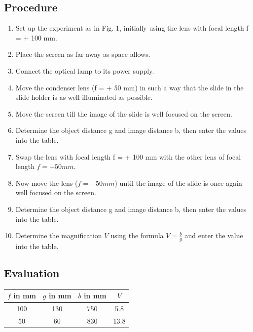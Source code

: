 \documentclass[12pt]{article}
\begin{document}
\subsection*{Procedure}

\begin{enumerate}
    \item Set up the experiment as in Fig. 1, initially using the lens with focal length f = + 100 mm.
    \item Place the screen as far away as space allows.
    \item Connect the optical lamp to its power supply.
    \item Move the condenser lens (f = + 50 mm) in such a way that the slide in the slide holder is as well illuminated as possible.
    \item Move the screen till the image of the slide is well focused on the screen.
    \item Determine the object distance g and image distance b, then enter the values into the table.
    \item Swap the lens with focal length f = + 100 mm with the other lens of focal length $f = + 50 mm$.
    \item Now move the lens ($f = + 50 mm$) until the image of the slide is once again well focused on the screen.
    \item Determine the object distance g and image distance b, then enter the values into the table.
    \item Determine the magnification $V$ using the formula $V=\frac{b}{g}$ and enter the value into the table. 
\end{enumerate}

\subsection*{Evaluation}
\begin{tabular}{|c|c|c|c|}
    \hline
    $f$ in mm & $g$ in mm & $b$ in mm & $V$  \\
    \hline
    100 & 130 & 750 & 5.8 \\
    \hline
    50 & 60 & 830 & 13.8  \\
    \hline
\end{tabular}
\end{document}
